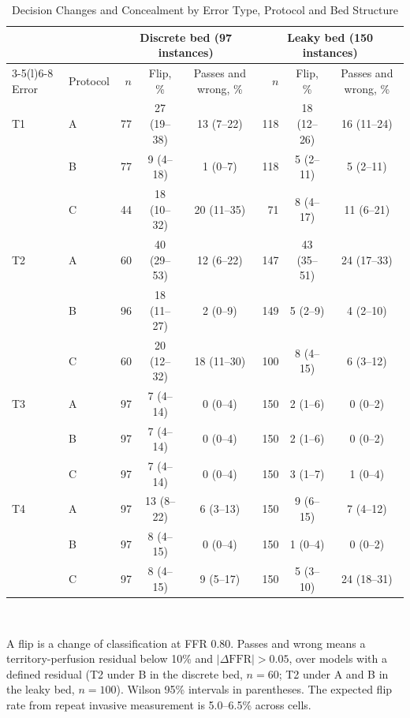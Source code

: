\documentclass[journal]{IEEEtran}
\begin{document}
\begin{table}[!t]
\caption{Decision Changes and Concealment by Error Type, Protocol and Bed Structure}
\label{tab:results}
\centering\footnotesize
\begin{tabular}{@{}llrccrcc@{}}
\toprule
 & & \multicolumn{3}{c}{Discrete bed (97 instances)} & \multicolumn{3}{c}{Leaky bed (150 instances)}\\
\cmidrule(lr){3-5}\cmidrule(l){6-8}
Error & Protocol & $n$ & Flip, \% & Passes and wrong, \% & $n$ & Flip, \% & Passes and wrong, \%\\
\midrule
T1 & A & 77 & 27 (19--38) & 13 (7--22) & 118 & 18 (12--26) & 16 (11--24) \\
 & B & 77 & 9 (4--18) & 1 (0--7) & 118 & 5 (2--11) & 5 (2--11) \\
 & C & 44 & 18 (10--32) & 20 (11--35) & 71 & 8 (4--17) & 11 (6--21) \\
\addlinespace[2pt]
T2 & A & 60 & 40 (29--53) & 12 (6--22) & 147 & 43 (35--51) & 24 (17--33) \\
 & B & 96 & 18 (11--27) & 2 (0--9) & 149 & 5 (2--9) & 4 (2--10) \\
 & C & 60 & 20 (12--32) & 18 (11--30) & 100 & 8 (4--15) & 6 (3--12) \\
\addlinespace[2pt]
T3 & A & 97 & 7 (4--14) & 0 (0--4) & 150 & 2 (1--6) & 0 (0--2) \\
 & B & 97 & 7 (4--14) & 0 (0--4) & 150 & 2 (1--6) & 0 (0--2) \\
 & C & 97 & 7 (4--14) & 0 (0--4) & 150 & 3 (1--7) & 1 (0--4) \\
\addlinespace[2pt]
T4 & A & 97 & 13 (8--22) & 6 (3--13) & 150 & 9 (6--15) & 7 (4--12) \\
 & B & 97 & 8 (4--15) & 0 (0--4) & 150 & 1 (0--4) & 0 (0--2) \\
 & C & 97 & 8 (4--15) & 9 (5--17) & 150 & 5 (3--10) & 24 (18--31) \\
\bottomrule
\end{tabular}
\\[2pt]
\parbox{\textwidth}{\footnotesize A flip is a change of classification at FFR 0.80. Passes and wrong means a territory-perfusion residual below 10\% and $|\Delta\mathrm{FFR}| > 0.05$, over models with a defined residual (T2 under B in the discrete
bed, $n = 60$; T2 under A and B in the leaky bed, $n = 100$). Wilson 95\% intervals in parentheses. The expected flip
rate from repeat invasive measurement is 5.0--6.5\% across cells.}
\end{table}
\end{document}
